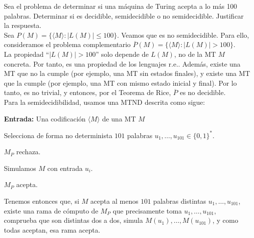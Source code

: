 
\begin{ejercicio}
    Sea el problema de determinar si una máquina de Turing acepta a lo más 100 palabras. 
    Determinar si es decidible, semidecidible o no semidecidible. Justificar la respuesta. \\

    Sea $P(M) = \{\langle M \rangle : |L(M)| \leq 100\}$. Veamos que es no semidecidible. 
    Para ello, consideramos el problema complementario $\overline{P}(M) = \{\langle M \rangle : |L(M)| > 100\}$. \\
    
    La propiedad ``$|L(M)| > 100$'' solo depende de $L(M)$, no de la MT $M$ concreta. Por tanto, es una propiedad
    de los lenguajes r.e.. Además, existe una MT que no la cumple (por ejemplo, una MT sin estados finales), y 
    existe una MT que la cumple (por ejemplo, una MT con mismo estado inicial y final). Por lo tanto, es no trivial,
    y entonces, por el Teorema de Rice, $\overline{P}$ es no decidible. \\
    
    Para la semidecidibilidad, usamos una MTND descrita como sigue:
    
    \begin{algorithm}
        \caption{MTND $M_{P}$}
        \label{algorithm:al-menos-101-semidecidible}
        \begin{algorithmic}
            \State \textbf{Entrada:} Una codificación $\langle M \rangle$ de una MT $M$

            \State Selecciona de forma no determinista $101$ palabras $u_1,\dots,u_{101} \in \{0,1\}^{*}$.

                \State $M_{P}$ rechaza.
            \EndIf

                \State Simulamos $M$ con entrada $u_i$.
            \EndFor

                \State $M_{P}$ acepta.
            \EndIf
        \end{algorithmic}
    \end{algorithm}

    Tenemos entonces que, si $M$ acepta al menos $101$ palabras distintas 
    $u_1,\dots,u_{101}$, existe una rama de cómputo de $M_P$ que precisamente 
    toma $u_1,\dots,u_{101}$, comprueba que son distintas dos a dos, simula 
    $M(u_1),\dots,M(u_{101})$, y como todas aceptan, esa rama acepta. \\


\end{ejercicio}

